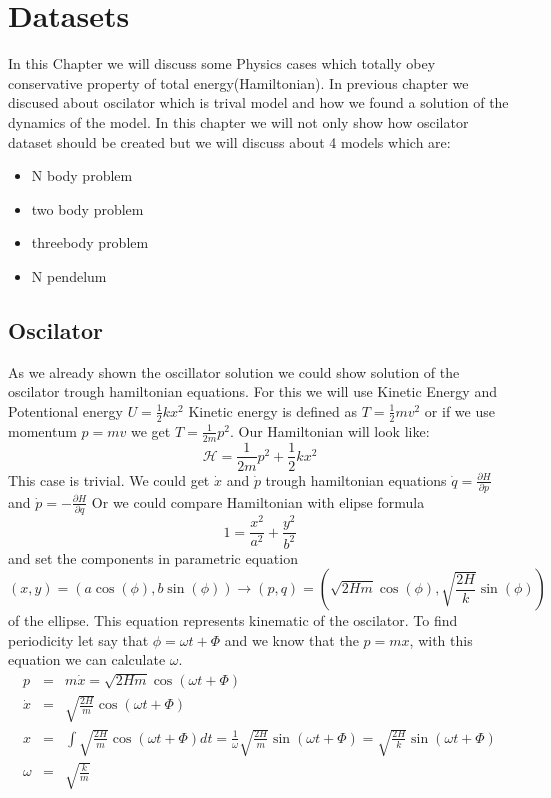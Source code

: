 \chapter{Datasets}
In this Chapter we will discuss some Physics cases which totally obey conservative property of total energy(Hamiltonian). In previous chapter we discused about oscilator which is trival model and how we found a solution of the dynamics of the model. In this chapter we will not only show how oscilator dataset should be created but we will discuss about 4 models which are:
\begin{itemize}
	\item  N body problem
	\item two body problem
	\item threebody problem
	\item N pendelum
\end{itemize}

\section{Oscilator}
As we already shown the oscillator solution we could show solution of the oscilator trough hamiltonian equations.
For this we will use Kinetic Energy and Potentional energy $U = \frac{1}{2}kx^2$ 
Kinetic energy is defined as $T =\frac{1}{2}mv^2$ or if we use momentum $p = mv$ we get  $T =\frac{1}{2m}p^2$.
Our Hamiltonian will look like:
\begin{equation}
	\mathcal{H} = \frac{1}{2m}p^2 + \frac{1}{2}kx^2
\end{equation} 
This case is trivial.
We could get $\dot{x}$ and $\dot{p}$ trough hamiltonian equations $\dot{q} = \frac{\partial H}{\partial p}$ and $\dot{p} = - \frac{\partial H}{\partial q}$
Or we could compare Hamiltonian with elipse formula
\begin{equation}
	1 = \frac{x^2}{a^2} + \frac{y^2}{b^2}
\end{equation} and set the components in parametric equation\begin{equation}
(x,y) = (a\cos(\phi),b\sin(\phi)) \rightarrow(p,q) = \left(\sqrt{2Hm}\cos(\phi),\sqrt{\frac{2H}{k}}\sin(\phi)\right)
\end{equation} of the ellipse. This equation represents kinematic of the oscilator. To find periodicity let say that $\phi = \omega t + \Phi $ and we know that the $p = mx$, with this equation we can calculate $\omega$.
\begin{eqnarray}
	p &=& m\dot{x} =\sqrt{2Hm}\cos(\omega t + \Phi) \\
	\dot{x} &=& \sqrt{\frac{2H}{m}}\cos(\omega t + \Phi)\\
		x &=& \int \sqrt{\frac{2H}{m}}\cos(\omega t + \Phi)dt = \frac{1}{\omega}\sqrt{\frac{2H}{m}}\sin(\omega t + \Phi) = \sqrt{\frac{2H}{k}} \sin(\omega t + \Phi)\\
	\omega &=& \sqrt{\frac{k}{m}} 
\end{eqnarray}  




